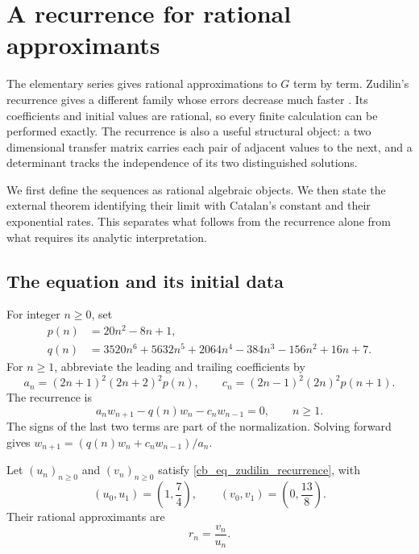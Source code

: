 \chapter{A recurrence for rational approximants}
\label{cb_ch_recurrence}

The elementary series gives rational approximations to $G$ term by term.
Zudilin's recurrence gives a different family whose errors decrease much
faster \cite{Zudilin2003}. Its coefficients and initial values are rational,
so every finite calculation can be performed exactly. The recurrence is
also a useful structural object: a two dimensional transfer matrix carries
each pair of adjacent values to the next, and a determinant tracks the
independence of its two distinguished solutions.

We first define the sequences as rational algebraic objects. We then state
the external theorem identifying their limit with Catalan's constant and
their exponential rates. This separates what follows from the recurrence
alone from what requires its analytic interpretation.

\section{The equation and its initial data}

For integer $n\geq0$, set
\begin{align}
 p(n)&=20n^2-8n+1,\label{cb_eq_p_polynomial}\\
 q(n)&=3520n^6+5632n^5+2064n^4-384n^3-156n^2+16n+7.
 \label{cb_eq_q_polynomial}
\end{align}
For $n\geq1$, abbreviate the leading and trailing coefficients by
\begin{equation}\label{cb_eq_a_c_def}
 a_n=(2n+1)^2(2n+2)^2p(n),\qquad
 c_n=(2n-1)^2(2n)^2p(n+1).
\end{equation}
The recurrence is
\begin{equation}\label{cb_eq_zudilin_recurrence}
 a_nw_{n+1}-q(n)w_n-c_nw_{n-1}=0,\qquad n\geq1.
\end{equation}
The signs of the last two terms are part of the normalization. Solving
forward gives $w_{n+1}=(q(n)w_n+c_nw_{n-1})/a_n$.

\begin{definition}\label{cb_def_uv}
Let $(u_n)_{n\geq0}$ and $(v_n)_{n\geq0}$ satisfy
\eqref{cb_eq_zudilin_recurrence}, with
\begin{equation}\label{cb_eq_uv_initial}
 (u_0,u_1)=\left(1,\frac74\right),\qquad
 (v_0,v_1)=\left(0,\frac{13}{8}\right).
\end{equation}
Their rational approximants are
\begin{equation}\label{cb_eq_r_def}
 r_n=\frac{v_n}{u_n}.
\end{equation}
\end{definition}

